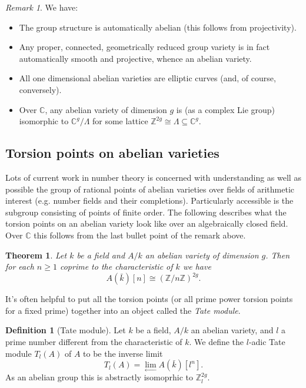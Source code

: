 \documentclass[12pt]{amsart}
\numberwithin{equation}{section}
\newtheorem{theorem}[equation]{Theorem}
\theoremstyle{remark}
\newtheorem{remark}[equation]{Remark}
\theoremstyle{definition}
\theoremstyle{definition}
\theoremstyle{definition}
\newtheorem{defi}[equation]{Definition}
\theoremstyle{definition}
\theoremstyle{definition}
\theoremstyle{definition}
\begin{document}
\begin{remark}
We have:
\begin{itemize}
\item The group structure is automatically abelian (this follows from projectivity). 
\item Any proper, connected, geometrically reduced group variety is in fact automatically smooth and projective, whence an abelian variety.
\item All one dimensional abelian varieties are elliptic curves (and, of course, conversely).
\item Over $\mathbb{C}$, any abelian variety of dimension $g$ is (as a complex Lie group) isomorphic to $\mathbb{C}^g/\Lambda$ for some lattice $\mathbb{Z}^{2g}\cong \Lambda\subseteq \mathbb{C}^g$.
\end{itemize}
\end{remark}


\subsection{Torsion points on abelian varieties}

Lots of current work in number theory is concerned with understanding as well as possible the group of rational points of abelian varieties over fields of arithmetic interest (e.g. number fields and their completions). Particularly accessible is the subgroup consisting of points of finite order. The following describes what the torsion points on an abelian variety look like over an algebraically closed field. Over $\mathbb{C}$ this follows from the last bullet point of the remark above.

\begin{theorem}
Let $k$ be a field  and $A/k$ an abelian variety of dimension $g$. Then for each $n\geq 1$ coprime to the characteristic of $k$ we have
\[A(\bar{k})[n]\cong (\mathbb{Z}/n\mathbb{Z})^{2g}.\]
\end{theorem}

It's often helpful to put all the torsion points (or all prime power torsion points for a fixed prime) together into an object called the \textit{Tate module}.

\begin{defi}[Tate module]
Let $k$ be a field, $A/k$ an abelian variety, and $l$ a prime number different from the characteristic of $k$. We define the $l$-adic Tate module $T_l(A)$ of $A$ to be the inverse limit
\[T_l(A)=\lim_{\leftarrow}A(\bar{k})[l^n].\]
As an abelian group this is abstractly isomoprhic to $\mathbb{Z}_l^{2g}.$
\end{defi}
\end{document}
